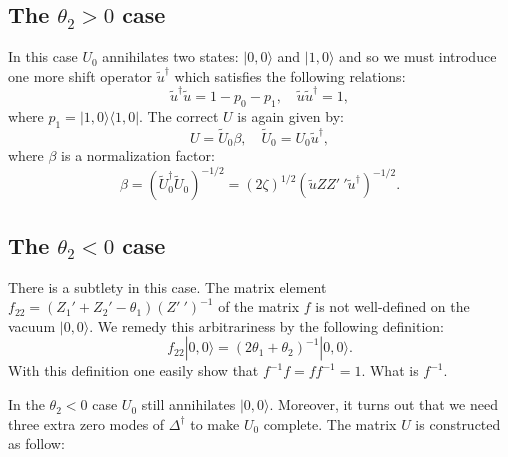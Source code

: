 \documentclass[a4paper,a4paper]{article}
\begin{document}
\subsection{The $\theta_2>0$ case}

In this case $U_0$ annihilates two states: $|0,0\rangle$ and
$|1,0\rangle$ and so we must introduce one more shift operator
$\tilde{u}^\dag$ which satisfies the following relations:
\begin{equation}
\tilde u^\dag\tilde u=1-p_0-p_1,\quad\tilde u\tilde u^\dag=1,
\end{equation}
where $p_1=|1,0\rangle\langle 1,0|$. The correct $U$ is again
given by:
\begin{equation}
U=\tilde U_0\beta,\quad\tilde U_0=U_0\tilde u^\dag,
\end{equation}
where $\beta$ is a normalization factor:
\begin{equation}
\beta=(\tilde U_0^\dag\tilde U_0)^{-1/2}=(2\zeta)^{1/2}
(\tilde{u}ZZ'~'\tilde{u}^\dag)^{-1/2}.
\end{equation}

\subsection{The $\theta_2<0$ case}

There is a subtlety in this case. The matrix element
$f_{22}=(Z_1'+Z_2'-\theta_1)(Z'~')^{-1}$ of the matrix $f$ is not
well-defined on the vacuum $|0,0\rangle$. We remedy this
arbitrariness by the following definition:
\begin{equation}
f_{22}|0,0\rangle=(2\theta_1+\theta_2)^{-1}|0,0\rangle.
\end{equation}
With this definition one easily show that $f^{-1}f=ff^{-1}=1$.
What is $f^{-1}$.

In the $\theta_2<0$ case $U_0$ still annihilates $|0,0\rangle$.
Moreover, it turns out that we need three extra zero modes of
$\Delta^\dag$ to make $U_0$ complete. The matrix $U$ is
constructed as follow:
\end{document}
